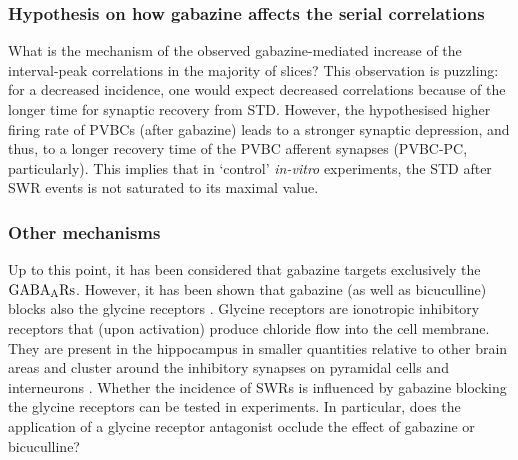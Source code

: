     \subsubsection{Hypothesis on how gabazine affects the serial correlations}
    What is the mechanism of the observed gabazine-mediated increase of the
    interval-peak correlations in the majority of slices? This observation is
    puzzling: for a decreased incidence, one would expect decreased
    correlations because of the longer time for synaptic recovery from STD.
    However, the hypothesised higher firing rate of PVBCs (after gabazine)
    leads to a stronger synaptic depression, and thus, to a longer recovery
    time of the PVBC afferent synapses (PVBC-PC, particularly). This implies
    that in `control' \textit{in-vitro} experiments, the STD after SWR events
    is not saturated to its maximal value.
      

    \subsubsection{Other mechanisms} 
      Up to this point, it has been considered that gabazine targets
      exclusively the $\rm GABA_ARs$. However, it has been shown that gabazine
      (as well as bicuculline) blocks also the glycine receptors
      \citep{Wang2005, Li2007}. Glycine receptors are ionotropic inhibitory
      receptors that (upon activation) produce chloride flow into the cell
      membrane. They are present in the hippocampus in smaller quantities
      relative to other brain areas \citep{denPol1988} and cluster around the
      inhibitory synapses on pyramidal cells and interneurons \citep{Levi2004}.
      Whether the incidence of SWRs is influenced by gabazine blocking the
      glycine receptors can be tested in experiments. In particular, does the
      application of a glycine receptor antagonist occlude the effect of
      gabazine or bicuculline?

